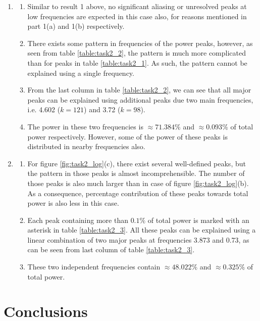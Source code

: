 \documentclass[a4paper]{article}
\begin{document}
\begin{enumerate}
			\item \begin{enumerate}
				\item Similar to result 1 above, no significant aliasing or unresolved peaks at low frequencies are expected in this case also, for reasons mentioned in part 1(a) and 1(b) respectively. 
				\item There exists some pattern in frequencies of the power peaks, however, as seen from table \ref{table:task2_2}, the pattern is much more complicated than for peaks in table \ref{table:task2_1}. As such, the pattern cannot be explained using a single frequency.
				\item From the last column in table \ref{table:task2_2}, we can see that all major peaks can be explained using additional peaks due two main frequencies, i.e. 4.602 (\(k=121\)) and 3.72 (\(k=98\)). 
				\item The power in these two frequencies is \(\approx 71.384\%\) and \(\approx 0.093\%\) of total power respectively. However, some of the power of these peaks is distributed in nearby frequencies also.
			\end{enumerate}
		
			\item \begin{enumerate}
				\item For figure \ref{fig:task2_log}(c), there exist several well-defined peaks, but the pattern in those peaks is almost incomprehensible. The number of those peaks is also much larger than in case of figure \ref{fig:task2_log}(b). As a consequence, percentage contribution of these peaks towards total power is also less in this case.
				\item Each peak containing more than \(0.1\%\) of total power is marked with an asterisk in table \ref{table:task2_3}. All these peaks can be explained using a linear combination of two major peaks at frequencies 3.873 and 0.73, as can be seen from last column of table \ref{table:task2_3}.
				\item These two independent frequencies contain \(\approx 48.022\%\) and \(\approx 0.325\%\) of total power.   
			\end{enumerate}
			
		\end{enumerate}
	
	
	\section{Conclusions} \label{conclusions}
	
	
\end{document}
